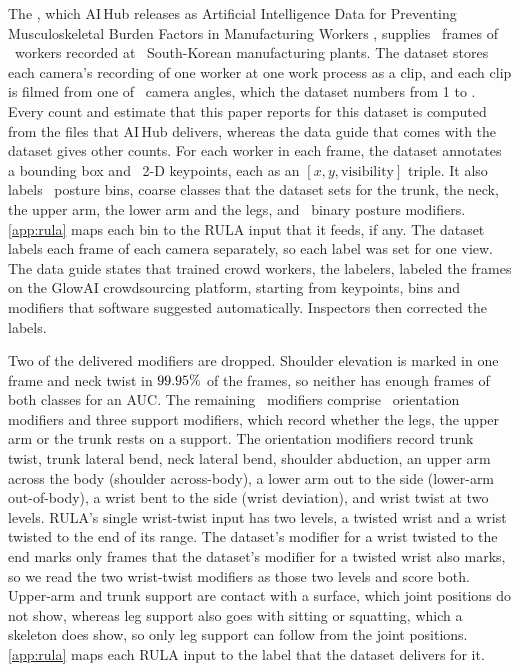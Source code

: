 \documentclass[review,3p,authoryear]{elsarticle}
\begin{document}
The \datasetName, which AI\,Hub releases as Artificial Intelligence Data for Preventing
Musculoskeletal Burden Factors in Manufacturing Workers \citep{aihubmsk}, supplies \nFrames\
frames of \nSubjects\ workers recorded at \nFactories\ South-Korean manufacturing plants.
The dataset stores each camera's recording of one worker at one work process as a clip,
and each clip is filmed from one of \nAngles\ camera angles, which the dataset numbers
from 1 to \nAngles. Every count and estimate that this paper reports for this dataset is
computed from the files that AI\,Hub delivers, whereas the data guide that comes with the dataset
\citep{aihubmsk} gives other counts. For each worker in each frame, the dataset annotates
a bounding box and \nKeypoints\ 2-D keypoints, each as an $[x,y,\text{visibility}]$
triple. It also labels \nPostureBins\ posture bins, coarse classes that the dataset sets for the
trunk, the neck, the upper arm, the lower arm and the legs, and
\nModifiersDelivered\ binary posture modifiers. \ref{app:rula} maps each bin to the RULA input that it feeds, if any.
The dataset labels each frame of each camera separately, so each label was set for one
view. The data guide states that trained crowd workers, the labelers, labeled the frames on
the GlowAI crowdsourcing platform, starting from keypoints, bins and modifiers that
software suggested automatically. Inspectors then corrected the labels.

Two of the delivered modifiers are dropped. Shoulder elevation is marked in one frame and
neck twist in $99.95\%$ of the frames, so neither has enough frames of both
classes for an AUC. The remaining \nModifiersUsable\ modifiers comprise \nOrientModifiers\
orientation modifiers and three support modifiers, which record whether the legs, the upper
arm or the trunk rests on a support. The orientation modifiers record trunk
twist, trunk lateral bend, neck lateral bend, shoulder abduction, an upper arm across the
body (shoulder across-body), a lower arm out to the side (lower-arm out-of-body), a wrist bent to the side (wrist deviation), and wrist twist at two levels. RULA's single wrist-twist input
has two levels, a twisted wrist and a wrist twisted to the end of its range. The dataset's
modifier for a wrist twisted to the end marks only frames that the dataset's modifier for a
twisted wrist also marks, so we read the two wrist-twist modifiers as those two levels and
score both. Upper-arm and trunk
support are contact with a surface, which joint positions do not show, whereas leg support
also goes with sitting or squatting, which a skeleton does show, so only leg support can
follow from the joint positions. \ref{app:rula} maps each
RULA input to the label that the dataset delivers for it.
\end{document}
